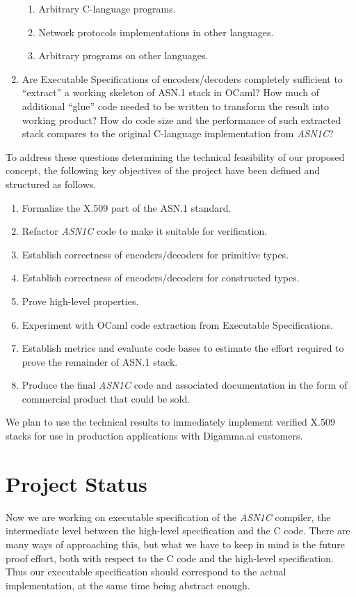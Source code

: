 \documentclass[acmsmall,nonacm]{acmart}
\begin{document}
\begin{enumerate}
\begin{enumerate}
    \item Arbitrary C-language programs.
    \item Network protocols implementations in other languages.
    \item Arbitrary programs on other languages.
    \end{enumerate}
  \item Are Executable Specifications of encoders/decoders completely sufficient to ``extract'' a working skeleton of ASN.1 stack in OCaml? How much of additional ``glue'' code needed to be written to transform the result into working product? How do code size and the performance of such extracted stack compares to the original C-language implementation from \emph{ASN1C}?  
\end{enumerate}

To address these questions determining the technical feasibility of
our proposed concept, the following key objectives of the project have
been defined and structured as follows.

\begin{enumerate}
\item Formalize the X.509 part of the ASN.1 standard.     
\item Refactor \emph{ASN1C} code to make it suitable for verification.
\item Establish correctness of encoders/decoders for primitive types.
\item Establish correctness of encoders/decoders for constructed types.
\item Prove high-level properties.
\item Experiment with OCaml code extraction from Executable Specifications.
\item Establish metrics and evaluate code bases to estimate the effort required to prove the remainder of ASN.1 stack.
\item Produce the final \emph{ASN1C} code and associated documentation in the form of commercial product that could be sold.
\end{enumerate}

We plan to use the technical results to immediately implement verified
X.509 stacks for use in production applications with Digamma.ai
customers.
 
\section{Project Status}

Now we are working on executable specification of the \emph{ASN1C}
compiler, the intermediate level between the high-level specification
and the C code. There are many ways of approaching this, but what we
have to keep in mind is the future proof effort, both with respect to
the C code and the high-level specification. Thus our executable
specification should correspond to the actual implementation, at the
same time being abstract enough.
\end{document}
